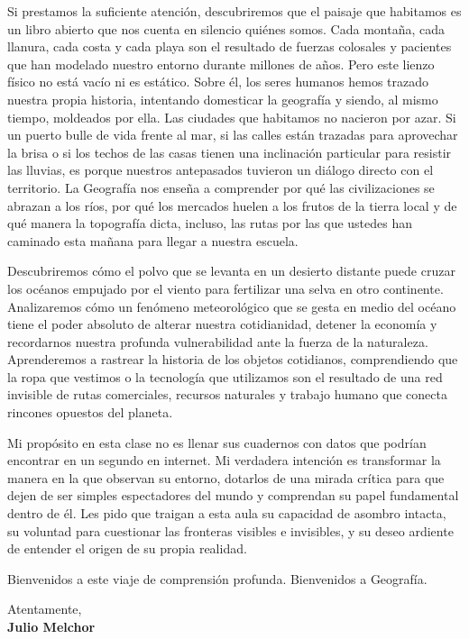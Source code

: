 \documentclass[11pt]{report}
\begin{document}
\begin{titlepage}
\vspace{0.7em}

Si prestamos la suficiente atención, descubriremos que el paisaje que habitamos es un libro abierto que nos cuenta en silencio quiénes somos. Cada montaña, cada llanura, cada costa y cada playa son el resultado de fuerzas colosales y pacientes que han modelado nuestro entorno durante millones de años. Pero este lienzo físico no está vacío ni es estático. Sobre él, los seres humanos hemos trazado nuestra propia historia, intentando domesticar la geografía y siendo, al mismo tiempo, moldeados por ella. Las ciudades que habitamos no nacieron por azar. Si un puerto bulle de vida frente al mar, si las calles están trazadas para aprovechar la brisa o si los techos de las casas tienen una inclinación particular para resistir las lluvias, es porque nuestros antepasados tuvieron un diálogo directo con el territorio. La Geografía nos enseña a comprender por qué las civilizaciones se abrazan a los ríos, por qué los mercados huelen a los frutos de la tierra local y de qué manera la topografía dicta, incluso, las rutas por las que ustedes han caminado esta mañana para llegar a nuestra escuela.

\vspace{0.7em}

Descubriremos cómo el polvo que se levanta en un desierto distante puede cruzar los océanos empujado por el viento para fertilizar una selva en otro continente. Analizaremos cómo un fenómeno meteorológico que se gesta en medio del océano tiene el poder absoluto de alterar nuestra cotidianidad, detener la economía y recordarnos nuestra profunda vulnerabilidad ante la fuerza de la naturaleza. Aprenderemos a rastrear la historia de los objetos cotidianos, comprendiendo que la ropa que vestimos o la tecnología que utilizamos son el resultado de una red invisible de rutas comerciales, recursos naturales y trabajo humano que conecta rincones opuestos del planeta. 

\vspace{0.7em}

Mi propósito en esta clase no es llenar sus cuadernos con datos que podrían encontrar en un segundo en internet. Mi verdadera intención es transformar la manera en la que observan su entorno, dotarlos de una mirada crítica para que dejen de ser simples espectadores del mundo y comprendan su papel fundamental dentro de él. Les pido que traigan a esta aula su capacidad de asombro intacta, su voluntad para cuestionar las fronteras visibles e invisibles, y su deseo ardiente de entender el origen de su propia realidad.

\vspace{0.7em}

Bienvenidos a este viaje de comprensión profunda. Bienvenidos a Geografía.

\vspace{0.7em}

\raggedright Atentamente,\\
\textbf{Julio Melchor}

\end{titlepage}
\end{document}
